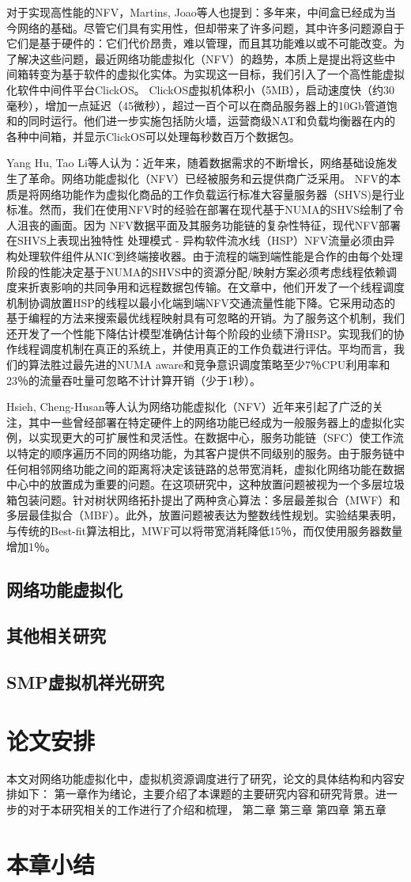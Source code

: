 对于实现高性能的NFV，Martins, Joao等人也提到：多年来，中间盒已经成为当今网络的基础。尽管它们具有实用性，但却带来了许多问题，其中许多问题源自于它们是基于硬件的：它们代价昂贵，难以管理，而且其功能难以或不可能改变。为了解决这些问题，最近网络功能虚拟化（NFV）的趋势，本质上是提出将这些中间箱转变为基于软件的虚拟化实体。为实现这一目标，我们引入了一个高性能虚拟化软件中间件平台ClickOS。 ClickOS虚拟机体积小（5MB），启动速度快（约30毫秒），增加一点延迟（45微秒），超过一百个可以在商品服务器上的10Gb管道饱和的同时运行。他们进一步实施包括防火墙，运营商级NAT和负载均衡器在内的各种中间箱，并显示ClickOS可以处理每秒数百万个数据包。

Yang Hu, Tao Li等人认为：近年来，随着数据需求的不断增长，网络基础设施发生了革命。网络功能虚拟化（NFV）已经被服务和云提供商广泛采用。 NFV的本质是将网络功能作为虚拟化商品的工作负载运行标准大容量服务器（SHVS)是行业标准。然而，我们在使用NFV时的经验在部署在现代基于NUMA的SHVS绘制了令人沮丧的画面。因为
NFV数据平面及其服务功能链的复杂性特征，现代NFV部署在SHVS上表现出独特性
处理模式 - 异构软件流水线（HSP）NFV流量必须由异构处理软件组件从NIC到终端接收器。由于流程的端到端性能是合作的由每个处理阶段的性能决定基于NUMA的SHVS中的资源分配/映射方案必须考虑线程依赖调度来折衷影响的共同争用和远程数据包传输。在文章中，他们开发了一个线程调度机制协调放置HSP的线程以最小化端到端NFV交通流量性能下降。它采用动态的基于编程的方法来搜索最优线程映射具有可忽略的开销。为了服务这个机制，我们还开发了一个性能下降估计模型准确估计每个阶段的业绩下滑HSP。实现我们的协作线程调度机制在真正的系统上，并使用真正的工作负载进行评估。平均而言，我们的算法胜过最先进的NUMA aware和竞争意识调度策略至少7％CPU利用率和23％的流量吞吐量可忽略不计计算开销（少于1秒）。

Hsieh, Cheng-Husan等人认为网络功能虚拟化（NFV）近年来引起了广泛的关注，其中一些曾经部署在特定硬件上的网络功能已经成为一般服务器上的虚拟化实例，以实现更大的可扩展性和灵活性。在数据中心，服务功能链（SFC）使工作流以特定的顺序遍历不同的网络功能，为其客户提供不同级别的服务。由于服务链中任何相邻网络功能之间的距离将决定该链路的总带宽消耗，虚拟化网络功能在数据中心中的放置成为重要的问题。在这项研究中，这种放置问题被视为一个多层垃圾箱包装问题。针对树状网络拓扑提出了两种贪心算法：多层最差拟合（MWF）和多层最佳拟合（MBF）。此外，放置问题被表达为整数线性规划。实验结果表明，与传统的Best-fit算法相比，MWF可以将带宽消耗降低15％，而仅使用服务器数量增加1％。


\subsection{网络功能虚拟化}
\subsection{其他相关研究}
\subsection{SMP虚拟机祥光研究}

\section{论文安排}
本文对网络功能虚拟化中，虚拟机资源调度进行了研究，论文的具体结构和内容安排如下：
第一章作为绪论，主要介绍了本课题的主要研究内容和研究背景。进一步的对于本研究相关的工作进行了介绍和梳理，
第二章
第三章
第四章
第五章
\section{本章小结}
